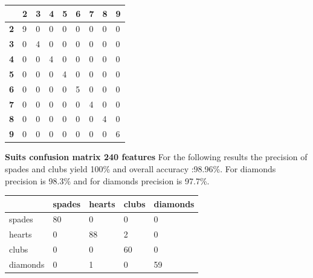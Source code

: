\documentclass[11pt]{article}
\theoremstyle{plain}
\theoremstyle{definition}
\begin{document}
\begin{center}
    \begin{tabular}{| l | l |  l | l |  l | l |  l | l |p{1cm} |}
    \hline
      & {\bf2} & {\bf3} & {\bf4} &{\bf5} &{\bf6} &{\bf7}&{\bf8}&{\bf9}\\ \hline
 	   {\bf2} & 9 & 0 &0  & 0 & 0 &  0&0 &0\\ \hline
 	   {\bf3} & 0 & 4 &  0& 0 &0  & 0 &0 &0\\ \hline
 	   {\bf4} & 0 & 0 & 4 &  0& 0 &  0& 0&0\\ \hline
 	   {\bf5} & 0 & 0 & 0 & 4 &  0& 0 & 0&0\\ \hline
 	   {\bf6} & 0 & 0 & 0 & 0 &5  & 0 &0 &0\\ \hline
 	   {\bf7} & 0 & 0 & 0 & 0 & 0 &4  & 0&0\\ \hline
 	   {\bf8} & 0 & 0 & 0 & 0 & 0 &0  &4 &0\\ \hline
 	   {\bf9 }& 0 & 0 & 0 & 0 & 0 &0  &0 &6\\ \hline
    \end{tabular}
 \end{center}
 \newpage
{\bf Suits confusion matrix 240 features}
\newline
For the following results the precision of spades and clubs yield 100\% and overall accuracy :98.96\%. For diamonds precision is 98.3\% and for diamonds precision is 97.7\%. 
 \begin{center}
    \begin{tabular}{| l | l |  l | l | p{2cm} |}
    \hline
      & spades & hearts & clubs &diamonds \\ \hline
 	   spades & 80 & 0 & 0 &0\\ \hline
 	   hearts & 0 & 88 & 2 &0\\ \hline
 	   clubs & 0 & 0 & 60 &0\\ \hline
 	   diamonds & 0 & 1 & 0&59\\ \hline
    \end{tabular}
 \end{center}
\end{document}

